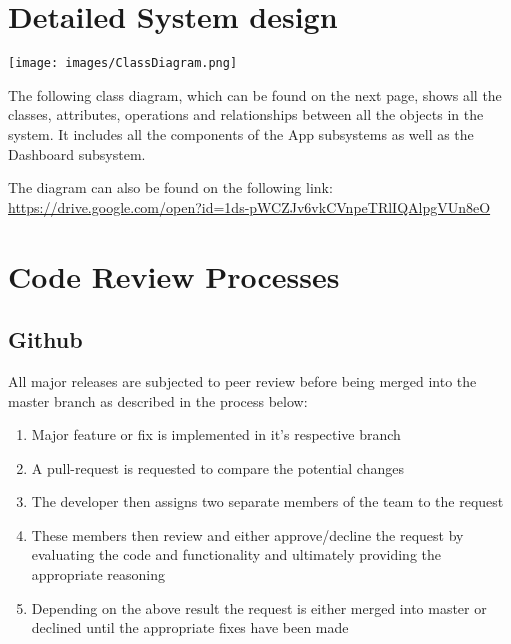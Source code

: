 \documentclass[a4paper, 11pt]{article}
\begin{document}
\section{Detailed System design}
\begin{sidewaysfigure}
    \texttt{[image: images/ClassDiagram.png]}
\end{sidewaysfigure}
The following class diagram, which can be found on the next page, shows all the classes, attributes, operations and relationships between all the objects in the system.
It includes all the components of the App subsystems as well as the Dashboard subsystem.

The diagram can also be found on the following link: \linebreak
\linebreak
\url{https://drive.google.com/open?id=1ds-pWCZJv6vkCVnpeTRlIQAlpgVUn8eO}

\pagebreak

\section{Code Review Processes}

\subsection{Github}
All major releases are subjected to peer review before being merged into the master branch as described in the process below:
\begin{enumerate}
    \item Major feature or fix is implemented in it's respective branch
    \item A pull-request is requested to compare the potential changes
    \item The developer then assigns two separate members of the team to the request
    \item These members then review and either approve/decline the request by evaluating the code and functionality and ultimately providing the appropriate reasoning
    \item Depending on the above result the request is either merged into master or declined until the appropriate fixes have been made
\end{enumerate}
\end{document}
